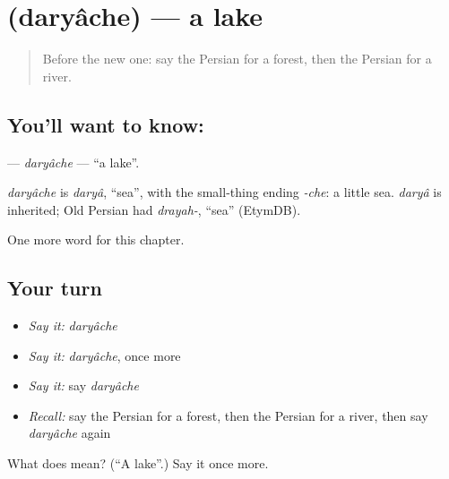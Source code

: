 \section[\texorpdfstring{\fa{دریاچه} (daryâche)}{دریاچه (daryâche)}]{ (daryâche) — a lake}

\label{lesson:FA-C52-daryache}



\begin{quote}
Before the new one: say the Persian for a forest, then the Persian for a river.
\end{quote}

\subsection*{You'll want to know: }
\textbf{} — \emph{daryâche} — \textquotedblleft{}a lake\textquotedblright{}.

\begin{cousinweb}
\emph{daryâche} is \emph{daryâ}, \textquotedblleft{}sea\textquotedblright{}, with the small-thing ending \emph{-che}: a little sea. \emph{daryâ} is inherited; Old Persian had \emph{drayah-}, \textquotedblleft{}sea\textquotedblright{} (EtymDB).
\end{cousinweb}

\begin{grammarlens}[title={What you've built}]
One more word for this chapter.
\end{grammarlens}

\subsection*{Your turn}
\begin{itemize}
\raggedright
  \item \emph{Say it:} \emph{daryâche}
  \item \emph{Say it:} \emph{daryâche}, once more
  \item \emph{Say it:} say \emph{daryâche}
  \item \emph{Recall:} say the Persian for a forest, then the Persian for a river, then say \emph{daryâche} again
\end{itemize}

\begin{tcolorbox}[breakable,colback=teal!4,colframe=teal!35!black,title={Before you move on}]
What does  mean? (\textquotedblleft{}A lake\textquotedblright{}.) Say it once more.
\end{tcolorbox}
